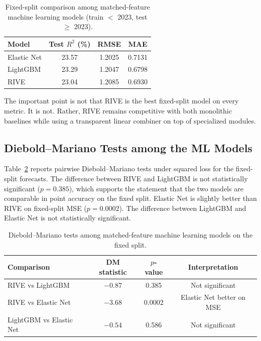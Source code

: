 \documentclass[review]{elsarticle}
\begin{document}
\begin{table}[H]
\centering
\caption{Fixed-split comparison among matched-feature machine learning models (train $<$ 2023, test $\geq$ 2023).}
\label{tab:ml-fixed-split}
\begin{tabular}{lccc}
\toprule
Model & Test $R^2$ (\%) & RMSE & MAE \\
\midrule
Elastic Net & 23.57 & 1.2025 & 0.7131 \\
LightGBM & 23.29 & 1.2047 & 0.6798 \\
RIVE & 23.04 & 1.2085 & 0.6930 \\
\bottomrule
\end{tabular}
\end{table}

The important point is not that RIVE is the best fixed-split model on every metric. It is not. Rather, RIVE remains competitive with both monolithic baselines while using a transparent linear combiner on top of specialized modules.

\subsection{Diebold--Mariano Tests among the ML Models}\label{sec:dm-ml}

Table~\ref{tab:dm-ml} reports pairwise Diebold--Mariano tests under squared loss for the fixed-split forecasts. The difference between RIVE and LightGBM is not statistically significant ($p=0.385$), which supports the statement that the two models are comparable in point accuracy on the fixed split. Elastic Net is slightly better than RIVE on fixed-split MSE ($p=0.0002$). The difference between LightGBM and Elastic Net is not statistically significant.

\begin{table}[H]
\centering
\caption{Diebold--Mariano tests among matched-feature machine learning models on the fixed split.}
\label{tab:dm-ml}
\begin{tabular}{lccc}
\toprule
Comparison & DM statistic & $p$-value & Interpretation \\
\midrule
RIVE vs LightGBM & $-0.87$ & 0.385 & Not significant \\
RIVE vs Elastic Net & $-3.68$ & 0.0002 & Elastic Net better on MSE \\
LightGBM vs Elastic Net & $-0.54$ & 0.586 & Not significant \\
\bottomrule
\end{tabular}
\end{table}
\end{document}
